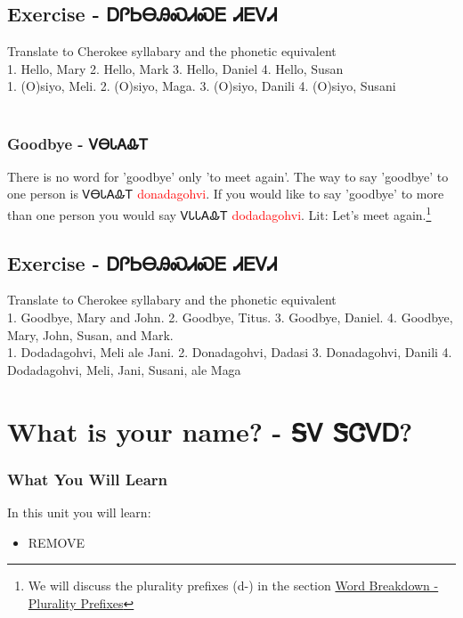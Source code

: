 \section{Exercise - ᎠᎵᏏᎾᎯᏍᏗᏍᎬ ᏗᎬᏙᏗ}
Translate to Cherokee syllabary and the phonetic equivalent\\
1. Hello, Mary 2. Hello, Mark 3. Hello, Daniel 4. Hello, Susan\\
1. (O)siyo, Meli. 2. (O)siyo, Maga. 3. (O)siyo, Danili 4. (O)siyo, Susani\\
\
\subsection{Goodbye - ᏙᎾᏓᎪᎲᎢ}
There is no word for 'goodbye' only 'to meet again'. The way to say 'goodbye' to one person is ᏙᎾᏓᎪᎲᎢ \textcolor{red}{donadagohvi}. If you would like to say 'goodbye' to more than one person you would say ᏙᏓᏓᎪᎲᎢ \textcolor{red}{dodadagohvi}.  Lit: Let's meet again.\footnote{We will discuss the plurality prefixes (d-) in the section \hyperref[sec:wordBreakdownPluralityPrefixes]{Word Breakdown - Plurality Prefixes}}
\section{Exercise - ᎠᎵᏏᎾᎯᏍᏗᏍᎬ ᏗᎬᏙᏗ}
Translate to Cherokee syllabary and the phonetic equivalent\\
1. Goodbye, Mary and John. 2. Goodbye, Titus. 3. Goodbye, Daniel. 4. Goodbye, Mary, John, Susan, and Mark.\\
1. Dodadagohvi, Meli ale Jani. 2. Donadagohvi, Dadasi 3. Donadagohvi, Danili 4. Dodadagohvi, Meli, Jani, Susani, ale Maga\\
\index{What is your name?}
\chapter{What is your name? - ᎦᏙ ᏕᏣᏙᎠ?}
\subsection{What You Will Learn}
In this unit you will learn:
\begin{itemize}
\item REMOVE
\end{itemize}\newpage

